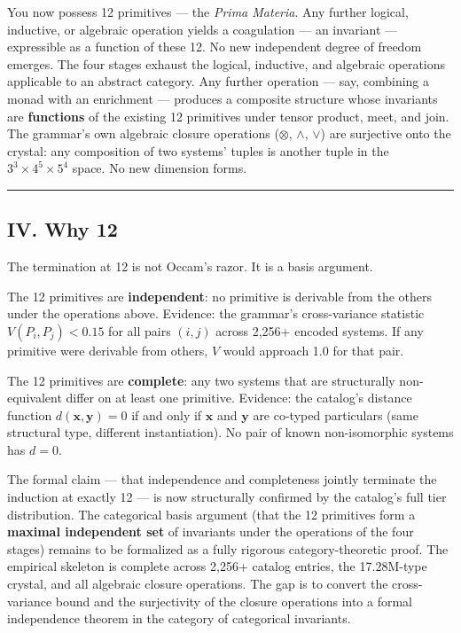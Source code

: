\documentclass[12pt,a4paper]{article}
\begin{document}
You now possess 12 primitives --- the \emph{Prima Materia}. Any further logical, inductive, or algebraic operation yields a coagulation --- an invariant --- expressible as a function of these 12. No new independent degree of freedom emerges. The four stages exhaust the logical, inductive, and algebraic operations applicable to an abstract category. Any further operation --- say, combining a monad with an enrichment --- produces a composite structure whose invariants are \textbf{functions} of the existing 12 primitives under tensor product, meet, and join. The grammar's own algebraic closure operations ($\otimes$, $\wedge$, $\vee$) are surjective onto the crystal: any composition of two systems' tuples is another tuple in the $3^3 \times 4^5 \times 5^4$ space. No new dimension forms.

\begin{center}
\rule{0.5\textwidth}{0.4pt}
\end{center}

\subsection{IV. Why 12}

The termination at 12 is not Occam's razor. It is a basis argument.

The 12 primitives are \textbf{independent}: no primitive is derivable from the others under the operations above. Evidence: the grammar's cross-variance statistic $V(P_i, P_j) < 0.15$ for all pairs $(i,j)$ across 2,256+ encoded systems. If any primitive were derivable from others, $V$ would approach 1.0 for that pair.

The 12 primitives are \textbf{complete}: any two systems that are structurally non-equivalent differ on at least one primitive. Evidence: the catalog's distance function $d(\mathbf{x},\mathbf{y}) = 0$ if and only if $\mathbf{x}$ and $\mathbf{y}$ are co-typed particulars (same structural type, different instantiation). No pair of known non-isomorphic systems has $d = 0$.

The formal claim --- that independence and completeness jointly terminate the induction at exactly 12 --- is now structurally confirmed by the catalog's full tier distribution. The categorical basis argument (that the 12 primitives form a \textbf{maximal independent set} of invariants under the operations of the four stages) remains to be formalized as a fully rigorous category-theoretic proof. The empirical skeleton is complete across 2,256+ catalog entries, the 17.28M-type crystal, and all algebraic closure operations. The gap is to convert the cross-variance bound and the surjectivity of the closure operations into a formal independence theorem in the category of categorical invariants.
\end{document}
